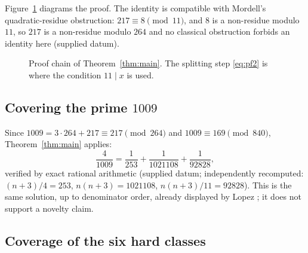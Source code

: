 \documentclass[11pt,a4paper]{article}
\theoremstyle{definition}
\begin{document}
Figure~\ref{fig:proofchain} diagrams the proof. The identity is compatible
with Mordell's quadratic-residue obstruction: $217 \equiv 8 \pmod{11}$, and
$8$ is a non-residue modulo $11$, so $217$ is a non-residue modulo $264$
and no classical obstruction forbids an identity here (supplied datum).

\begin{figure}[t]
  \centering
  \caption{Proof chain of Theorem~\ref{thm:main}. The splitting step
    \eqref{eq:pf2} is where the condition $11 \mid x$ is used.}
  \label{fig:proofchain}
\end{figure}

\subsection{Covering the prime $1009$}

Since $1009 = 3\cdot 264 + 217 \equiv 217 \pmod{264}$ and $1009 \equiv 169
\pmod{840}$, Theorem~\ref{thm:main} applies:
\begin{equation}
  \label{eq:1009}
  \frac{4}{1009} = \frac{1}{253} + \frac{1}{1021108} + \frac{1}{92828},
\end{equation}
verified by exact rational arithmetic (supplied datum; independently
recomputed: $(n+3)/4 = 253$, $n(n+3) = 1021108$,
$n(n+3)/11 = 92828$). This is the same solution, up to denominator order,
already displayed by Lopez \cite{lopez2024}; it does not support a novelty claim.

\subsection{Coverage of the six hard classes}
\end{document}
